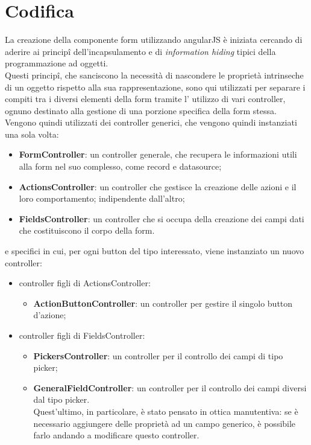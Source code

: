 \section{Codifica}
La creazione della componente form utilizzando angularJS è iniziata cercando di aderire ai principî dell'incapsulamento e di \emph{information hiding} tipici della programmazione ad oggetti.\\ Questi principî, che sanciscono la necessità di nascondere le proprietà intrinseche di un oggetto rispetto alla sua rappresentazione, sono qui utilizzati per separare i compiti tra i diversi elementi della form tramite l' utilizzo di vari controller, ognuno destinato alla gestione di una porzione specifica della form stessa.\\
Vengono quindi utilizzati dei controller generici, che vengono quindi instanziati una sola volta:
\begin{itemize}
	\item \textbf{FormController}: un controller generale, che recupera le informazioni utili alla form nel suo complesso, come record e datasource;
	\item \textbf{ActionsController}: un controller che gestisce la creazione delle azioni e il loro comportamento; indipendente dall'altro;
	\item \textbf{FieldsController}: un controller che si occupa della creazione dei campi dati che costituiscono il corpo della form.
\end{itemize}
e specifici in cui, per ogni button del tipo interessato, viene instanziato un nuovo controller:
\begin{itemize}
	\item controller figli di ActionsController:
	\begin{itemize}
		\item \textbf{ActionButtonController}: un controller per gestire il singolo button d'azione;
	\end{itemize} 
	\item controller figli di FieldsController:
	\begin{itemize}
		\item \textbf{PickersController}: un controller per il controllo dei campi di tipo picker;
		\item \textbf{GeneralFieldController}: un controller per il controllo dei campi diversi dal tipo picker. \\Quest'ultimo, in particolare, è stato pensato in ottica manutentiva: se è necessario aggiungere delle proprietà ad un campo generico, è possibile farlo andando a modificare questo controller.
	\end{itemize} 
\end{itemize} 




\newpage

